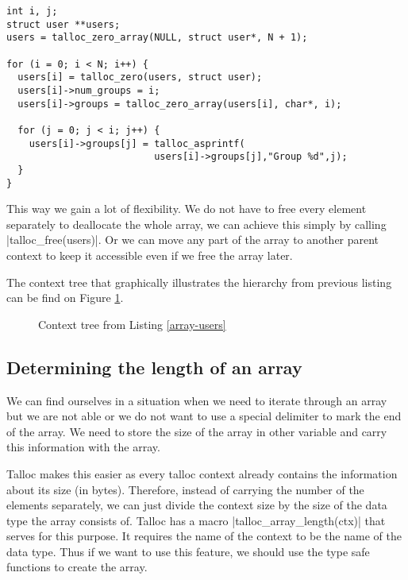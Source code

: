\begin{lstlisting}[caption={Array of users and context hierarchy},
label={array-users}] int i, j;
struct user **users;
users = talloc_zero_array(NULL, struct user*, N + 1);

for (i = 0; i < N; i++) {
  users[i] = talloc_zero(users, struct user);
  users[i]->num_groups = i;
  users[i]->groups = talloc_zero_array(users[i], char*, i);
  
  for (j = 0; j < i; j++) {
    users[i]->groups[j] = talloc_asprintf(
                          users[i]->groups[j],"Group %d",j);
  }
}
\end{lstlisting}

This way we gain a lot of flexibility. We do not have to free every element
separately to deallocate the whole array, we can achieve this simply by calling
|talloc_free(users)|. Or we can move any part of the array to another parent
context to keep it accessible even if we free the array later.

The context tree that graphically illustrates the hierarchy from previous
listing can be find on Figure \ref{fig:context-tree-array}.

\begin{figure}[H]
  \centering
  
  \caption{Context tree from Listing \ref{array-users}}
  \label{fig:context-tree-array}
\end{figure}

\subsection{Determining the length of an array}

We can find ourselves in a situation when we need to iterate through an array
but we are not able or we do not want to use a special delimiter to mark the
end of the array. We need to store the size of the array in other variable and
carry this information with the array.

Talloc makes this easier as every talloc context already contains the
information about its size (in bytes). Therefore, instead of carrying the number
of the elements separately, we can just divide the context size by the size of
the data type the array consists of. Talloc has a macro
|talloc_array_length(ctx)| that serves for this purpose. It requires the name of
the context to be the name of the data type. Thus if we want to use this
feature, we should use the type safe functions to create the array.

